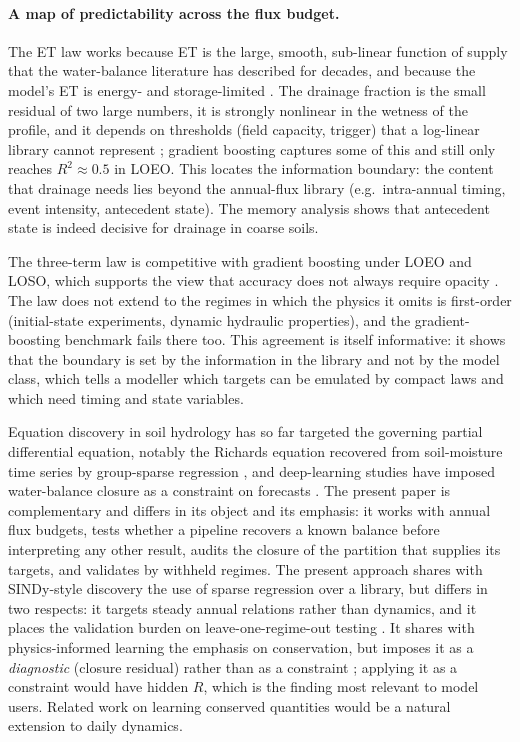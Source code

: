 \documentclass[preprint,12pt,authoryear]{elsarticle}
\begin{document}
\paragraph{A map of predictability across the flux budget.}
The ET law works because ET is the large, smooth, sub-linear function of supply that the water-balance literature has described for decades, and because the model's ET is energy- and storage-limited \citep{Budyko1974,Milly1994,Zhang2001}. The drainage fraction is the small residual of two large numbers, it is strongly nonlinear in the wetness of the profile, and it depends on thresholds (field capacity, trigger) that a log-linear library cannot represent \citep{Rodriguez2004}; gradient boosting captures some of this and still only reaches $R^2\approx0.5$ in LOEO. This locates the information boundary: the content that drainage needs lies beyond the annual-flux library (e.g.\ intra-annual timing, event intensity, antecedent state). The memory analysis shows that antecedent state is indeed decisive for drainage in coarse soils.

The three-term law is competitive with gradient boosting under LOEO and LOSO, which supports the view that accuracy does not always require opacity \citep{Rudin2019}. The law does not extend to the regimes in which the physics it omits is first-order (initial-state experiments, dynamic hydraulic properties), and the gradient-boosting benchmark fails there too. This agreement is itself informative: it shows that the boundary is set by the information in the library and not by the model class, which tells a modeller which targets can be emulated by compact laws and which need timing and state variables.

Equation discovery in soil hydrology has so far targeted the governing partial differential equation, notably the Richards equation recovered from soil-moisture time series by group-sparse regression \citep{Song2022,Song2025}, and deep-learning studies have imposed water-balance closure as a constraint on forecasts \citep{Li2024}. The present paper is complementary and differs in its object and its emphasis: it works with annual flux budgets, tests whether a pipeline recovers a known balance before interpreting any other result, audits the closure of the partition that supplies its targets, and validates by withheld regimes. The present approach shares with SINDy-style discovery \citep{Brunton2016} the use of sparse regression over a library, but differs in two respects: it targets steady annual relations rather than dynamics, and it places the validation burden on leave-one-regime-out testing \citep{Roberts2017}. It shares with physics-informed learning \citep{Raissi2019,Karniadakis2021} the emphasis on conservation, but imposes it as a \emph{diagnostic} (closure residual) rather than as a constraint \citep{Beucler2021}; applying it as a constraint would have hidden $R$, which is the finding most relevant to model users. Related work on learning conserved quantities \citep{Liu2021,Iten2020} would be a natural extension to daily dynamics.
\end{document}
